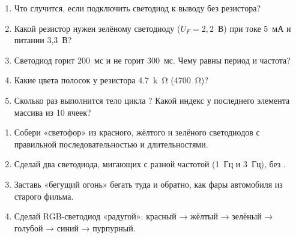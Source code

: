\begin{quiz}
\begin{enumerate}
  \item Что случится, если подключить светодиод к выводу без резистора?
  \item Какой резистор нужен зелёному светодиоду ($U_F = 2{,}2$~В) при токе 5~мА и питании 3,3~В?
  \item Светодиод горит 200~мс и не горит 300~мс. Чему равны период и частота?
  \item Какие цвета полосок у резистора \SI{4.7}{k\ohm} (4700~\si{\ohm})?
  \item Сколько раз выполнится тело цикла ? Какой индекс у последнего элемента массива из 10 ячеек?
\end{enumerate}
\end{quiz}

\begin{tasks}
\begin{enumerate}
  \item Собери «светофор» из красного, жёлтого и зелёного светодиодов с правильной последовательностью и длительностями.
  \item Сделай два светодиода, мигающих с разной частотой (1~Гц и 3~Гц), без .
  \item Заставь «бегущий огонь» бегать туда и обратно, как фары автомобиля из старого фильма.
  \item Сделай RGB-светодиод «радугой»: красный → жёлтый → зелёный → голубой → синий → пурпурный.
\end{enumerate}
\end{tasks}
